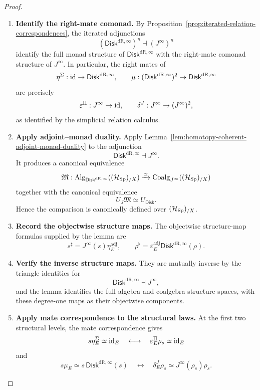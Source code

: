 \begin{proof}
\leavevmode
\begin{enumerate}[label=\textup{(\arabic*)}]
    \item \textbf{Identify the right-mate comonad.}
By Proposition~\ref{prop:iterated-relation-correspondences}, the iterated
adjunctions
\[
  (\mathsf{Disk}^{\mathrm{dR},\infty})^n\dashv(J^\infty)^n
\]
identify the full monad structure of \(\mathsf{Disk}^{\mathrm{dR},\infty}\) with
the right-mate comonad structure of \(J^\infty\). In particular,
the right mates of
\[
  \eta^\Sigma:\operatorname{id}\to \mathsf{Disk}^{\mathrm{dR},\infty},
  \qquad
  \mu:(\mathsf{Disk}^{\mathrm{dR},\infty})^2\to \mathsf{Disk}^{\mathrm{dR},\infty}
\]
are precisely
\[
  \varepsilon^\Pi:J^\infty\to\operatorname{id},
  \qquad
  \delta^J:J^\infty\to(J^\infty)^2,
\]
as identified by the simplicial relation calculus.

    \item \textbf{Apply adjoint--monad duality.}
Apply
Lemma~\ref{lem:homotopy-coherent-adjoint-monad-duality}
to the adjunction
\[
  \mathsf{Disk}^{\mathrm{dR},\infty}\dashv J^\infty.
\]
It produces a canonical equivalence
\[
  \mathfrak M:
  \operatorname{Alg}_{\mathsf{Disk}^{\mathrm{dR},\infty}}((\mathcal H_{\operatorname{Sp}})_{/X})
  \xrightarrow{\simeq}
  \operatorname{Coalg}_{J^\infty}((\mathcal H_{\operatorname{Sp}})_{/X})
\]
together with the canonical equivalence
\[
  U_J\mathfrak M
  \simeq
  U_{\mathsf{Disk}}.
\]
Hence the comparison is canonically defined over \((\mathcal H_{\operatorname{Sp}})_{/X}\).

    \item \textbf{Record the objectwise structure maps.}
The objectwise structure-map formulas supplied by the lemma are
\[
  s^\sharp
  =
  J^\infty(s)\eta^{\mathrm{adj}}_E,
  \qquad
  \rho^\flat
  =
  \varepsilon^{\mathrm{adj}}_E\mathsf{Disk}^{\mathrm{dR},\infty}(\rho).
\]

    \item \textbf{Verify the inverse structure maps.}
They are mutually inverse by the triangle identities for
\[
  \mathsf{Disk}^{\mathrm{dR},\infty}\dashv J^\infty,
\]
and the lemma identifies the full algebra and
coalgebra structure spaces, with these degree-one maps as their objectwise
components.

    \item \textbf{Apply mate correspondence to the structural laws.}
At the first two structural levels, the mate correspondence gives
\[
  s\eta^\Sigma_E\simeq\operatorname{id}_E
  \quad\longleftrightarrow\quad
  \varepsilon^\Pi_E\rho_s\simeq\operatorname{id}_E
\]
and
\[
  s\mu_E\simeq s\,\mathsf{Disk}^{\mathrm{dR},\infty}(s)
  \quad\longleftrightarrow\quad
  \delta^J_E\rho_s
  \simeq
  J^\infty(\rho_s)\rho_s.
\]


\end{enumerate}
\end{proof}

